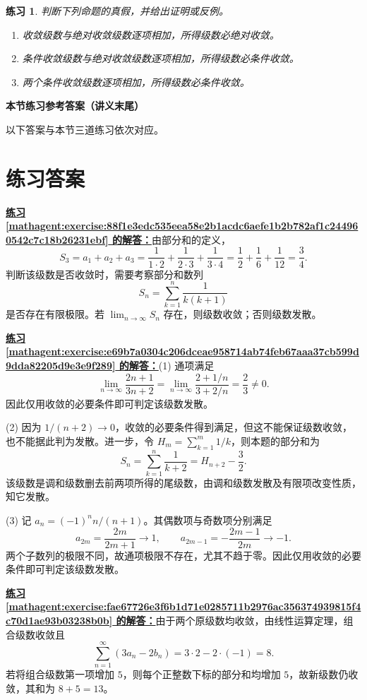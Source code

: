 \documentclass[UTF8,fontset=fandol,11pt]{ctexart}
\newtheorem{exercise}[definition]{练习}
\begin{document}
\begin{exercise}
\label{mathagent:exercise:15f24ef1d79299958d598c18e2c5f872d77ddb70db01666a2348f05d38173ea8}
判断下列命题的真假，并给出证明或反例。
\begin{enumerate}
\item 收敛级数与绝对收敛级数逐项相加，所得级数必绝对收敛。
\item 条件收敛级数与绝对收敛级数逐项相加，所得级数必条件收敛。
\item 两个条件收敛级数逐项相加，所得级数必条件收敛。
\end{enumerate}
\end{exercise}
\textbf{本节练习参考答案（讲义末尾）}

以下答案与本节三道练习依次对应。\par
\section*{练习答案}
\par\noindent\textbf{\hyperref[mathagent:exercise:88f1e3edc535eea58e2b1acdc6aefe1b2b782af1c244960542c7c18b26231ebf]{练习 \ref*{mathagent:exercise:88f1e3edc535eea58e2b1acdc6aefe1b2b782af1c244960542c7c18b26231ebf} 的解答：}}由部分和的定义，
\[
S_3=a_1+a_2+a_3
=\frac{1}{1\cdot2}+\frac{1}{2\cdot3}+\frac{1}{3\cdot4}
=\frac12+\frac16+\frac1{12}
=\frac34.
\]
判断该级数是否收敛时，需要考察部分和数列
\[
S_n=\sum_{k=1}^{n}\frac{1}{k(k+1)}
\]
是否存在有限极限。若 $\lim_{n\to\infty}S_n$ 存在，则级数收敛；否则级数发散。\par
\par\noindent\textbf{\hyperref[mathagent:exercise:e69b7a0304c206dceae958714ab74feb67aaa37cb599d9dda82205d9e3e9f289]{练习 \ref*{mathagent:exercise:e69b7a0304c206dceae958714ab74feb67aaa37cb599d9dda82205d9e3e9f289} 的解答：}}(1) 通项满足
\[
\lim_{n\to\infty}\frac{2n+1}{3n+2}
=\lim_{n\to\infty}\frac{2+1/n}{3+2/n}=\frac23\ne0.
\]
因此仅用收敛的必要条件即可判定该级数发散。

(2) 因为 $1/(n+2)\to0$，收敛的必要条件得到满足，但这不能保证级数收敛，也不能据此判为发散。进一步，令 $H_m=\sum_{k=1}^{m}1/k$，则本题的部分和为
\[
S_n=\sum_{k=1}^{n}\frac1{k+2}=H_{n+2}-\frac32.
\]
该级数是调和级数删去前两项所得的尾级数，由调和级数发散及有限项改变性质，知它发散。

(3) 记 $a_n=(-1)^n n/(n+1)$。其偶数项与奇数项分别满足
\[
a_{2m}=\frac{2m}{2m+1}\longrightarrow1,\qquad
a_{2m-1}=-\frac{2m-1}{2m}\longrightarrow-1.
\]
两个子数列的极限不同，故通项极限不存在，尤其不趋于零。因此仅用收敛的必要条件即可判定该级数发散。\par
\par\noindent\textbf{\hyperref[mathagent:exercise:fae67726e3f6b1d71e0285711b2976ac356374939815f4c70d1ae93b03238b0b]{练习 \ref*{mathagent:exercise:fae67726e3f6b1d71e0285711b2976ac356374939815f4c70d1ae93b03238b0b} 的解答：}}由于两个原级数均收敛，由线性运算定理，组合级数收敛且
\[
\sum_{n=1}^{\infty}(3a_n-2b_n)=3\cdot2-2\cdot(-1)=8.
\]
若将组合级数第一项增加 $5$，则每个正整数下标的部分和均增加 $5$，故新级数仍收敛，其和为 $8+5=13$。
\end{document}
